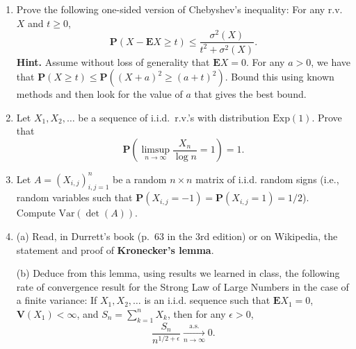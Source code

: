 \documentclass[12pt]{article}
\newcommand{\prob}{\mathbf{P}}
\newcommand{\expec}{\mathbf{E}}
\newcommand{\var}{\mathbf{V}}
\theoremstyle{example}
\begin{document}
\begin{enumerate}
\medskip\noindent \textbf{Hint.} To prove the theorem, let $P_n$ be the random variable given by
$$ P_n = \prod_{k=1}^n \left( p^{X_k} (1-p)^{1-X_k} \right). $$
Note that $P_n$ measures the probability of the sequence that was observed up to time $n$. (Somewhat unusually, in this problem the probability itself is thought of as a random variable). Try to represent $P_n$ in terms of cumulative sums of a sequence of i.i.d. random variables. Apply the Weak Law of Large Numbers to that sequence, and see where that gets you.

\item Prove the following one-sided version of Chebyshev's inequality: For any r.v.\ $X$ and $t\ge0$,
$$ \prob(X - \expec X \ge t) \le \frac{\sigma^2(X)}{t^2 + \sigma^2(X)}. $$
\textbf{Hint.} Assume without loss of generality that $\expec X=0$. For any $a>0$, we have that $\prob(X\ge t) \le \prob((X+a)^2\ge (a+t)^2)$. Bound this using known methods and then look for the value of $a$ that gives the best bound.

\item Let $X_1,X_2,\ldots$ be a sequence of i.i.d.\ r.v.'s with distribution $\textrm{Exp}(1)$. Prove that
$$ \prob\left( \limsup_{n\to\infty} \frac{X_n}{\log n} = 1\right) = 1. $$

\item Let $A=(X_{i,j})_{i,j=1}^n$ be a random $n\times n$ matrix of i.i.d. random signs (i.e., random variables such that $\prob(X_{i,j}=-1) = \prob(X_{i,j}=1)=1/2$). Compute $\textrm{Var}(\det(A))$.


\item (a) Read, in Durrett's book (p.\ 63 in the 3rd edition) or on Wikipedia, the statement and proof of \textbf{Kronecker's lemma}.

\medskip \noindent
(b) Deduce from this lemma, using results we learned in class, the following rate of convergence result for the Strong Law of Large Numbers in the case of a finite variance: If $X_1, X_2, \ldots$ is an i.i.d. sequence such that $\expec X_1 = 0$, $\var(X_1)<\infty$, and $S_n=\sum_{k=1}^n X_k$, then for any $\epsilon>0$,
$$ \frac{S_n}{n^{1/2+\epsilon}} \xrightarrow[n\to\infty]{\textrm{a.s.}} 0. $$


\end{enumerate}
\end{document}
